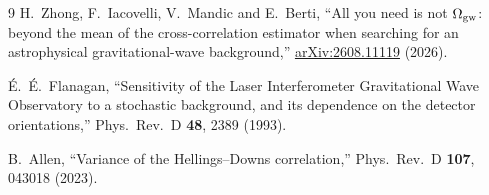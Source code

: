 \documentclass[11pt]{article}
\theoremstyle{remark}
\begin{document}
\begin{thebibliography}{9}
H.~Zhong, F.~Iacovelli, V.~Mandic and E.~Berti,
``All you need is not $\Omega_{\rm gw}$: beyond the mean of the
cross-correlation estimator when searching for an astrophysical
gravitational-wave background,''
\href{https://arxiv.org/abs/2608.11119}{arXiv:2608.11119} (2026).

\'E.~\'E.~Flanagan,
``Sensitivity of the Laser Interferometer Gravitational Wave Observatory to a
stochastic background, and its dependence on the detector orientations,''
Phys.\ Rev.\ D \textbf{48}, 2389 (1993).

B.~Allen,
``Variance of the Hellings--Downs correlation,''
Phys.\ Rev.\ D \textbf{107}, 043018 (2023).
\end{thebibliography}
\end{document}

